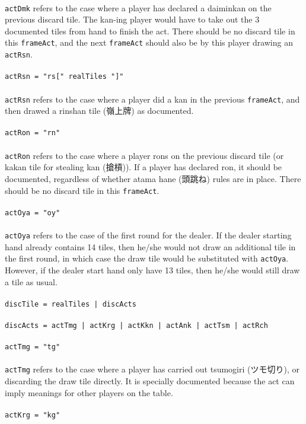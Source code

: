 \documentclass[%
	a4paper%
	,10pt%
	,twoside%
	,notitlepage%
]{article}%
\newcommand*{\ruleSymbol}{\textjapanese{⚠}}%
\newcommand*{\ruleMargin}{\marginpar{\flushright{}\ruleSymbol{}}}%
\newcommand*{\rulePar}{\paragraph*{\ruleMargin{}}}%
\begin{document}
			\paragraph*{}\lstinline/actDmk/ refers to the case where a player has declared a daiminkan on the previous discard tile. The kan-ing player would have to take out the 3 documented tiles from hand to finish the act. There should be no discard tile in this \lstinline/frameAct/, and the next \lstinline/frameAct/ should also be by this player drawing an \lstinline/actRsn/. %
			\rulePar{}\lstinline/actRsn = "rs[" realTiles "]"/%
			\paragraph*{}\lstinline/actRsn/ refers to the case where a player did a kan in the previous \lstinline/frameAct/, and then drawed a rinshan tile (\textjapanese{嶺上牌}) as documented. %
			\rulePar{}\lstinline/actRon = "rn"/%
			\paragraph*{}\lstinline/actRon/ refers to the case where a player rons on the previous discard tile (or kakan tile for stealing kan (\textjapanese{搶槓})). If a player has declared ron, it should be documented, regardless of whether atama hane (\textjapanese{頭跳ね}) rules are in place. There should be no discard tile in this \lstinline/frameAct/. %
			\rulePar{}\lstinline/actOya = "oy"/%
			\paragraph*{}\lstinline/actOya/ refers to the case of the first round for the dealer. If the dealer starting hand already contains 14 tiles, then he/she would not draw an additional tile in the first round, in which case the draw tile would be substituted with \lstinline/actOya/. However, if the dealer start hand only have 13 tiles, then he/she would still draw a tile as usual. %
			\rulePar{}\lstinline/discTile = realTiles | discActs/%
			\rulePar{}\lstinline/discActs = actTmg | actKrg | actKkn | actAnk | actTsm | actRch/%
			\rulePar{}\lstinline/actTmg = "tg"/%
			\paragraph*{}\lstinline/actTmg/ refers to the case where a player has carried out tsumogiri (\textjapanese{ツモ切り}), or discarding the draw tile directly. It is specially documented because the act can imply meanings for other players on the table. %
			\rulePar{}\lstinline/actKrg = "kg"/%
\end{document}

